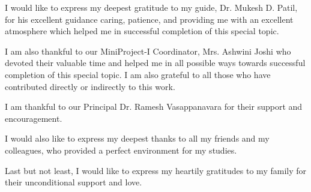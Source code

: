 %
%
%
%
%
%
%



\begin{acknowledgments}
I would like to express my deepest gratitude to my guide, Dr. Mukesh D. Patil, for
his excellent guidance caring, patience, and providing me with an excellent atmosphere which helped me in successful completion of this special topic.

I am also thankful to our MiniProject-I Coordinator, Mrs. Ashwini Joshi who devoted their
valuable time and helped me in all possible ways towards successful
completion of this special topic. I am also grateful to all those who have contributed
directly or indirectly to this work.

I am thankful to our Principal Dr. Ramesh Vasappanavara  for their support and encouragement.

I would also like to express my deepest thanks to all my friends and my colleagues, who provided a perfect environment for my studies.

Last but not least, I would like to express my heartily gratitudes to my family for
their unconditional support and love.
\end{acknowledgments}


